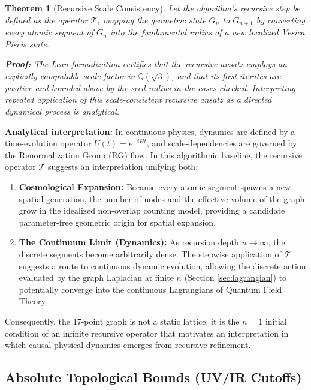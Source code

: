 \documentclass[12pt, a4paper]{article}
\newtheorem{theorem}{Theorem}
\begin{document}
\begin{theorem}[Recursive Scale Consistency]
Let the algorithm's recursive step be defined as the operator $\mathcal{T}$, mapping the geometric state $G_n$ to $G_{n+1}$ by converting every atomic segment of $G_n$ into the fundamental radius of a new localized Vesica Piscis state. 

\textbf{Proof:} The Lean formalization certifies that the recursive ansatz employs an explicitly computable scale factor in $\mathbb{Q}(\sqrt{3})$, and that its first iterates are positive and bounded above by the seed radius in the cases checked. Interpreting repeated application of this scale-consistent recursive ansatz as a directed dynamical process is analytical.
\end{theorem}

\textbf{Analytical interpretation:} In continuous physics, dynamics are defined by a time-evolution operator $U(t) = e^{-iHt}$, and scale-dependencies are governed by the Renormalization Group (RG) flow. In this algorithmic baseline, the recursive operator $\mathcal{T}$ suggests an interpretation unifying both:
\begin{enumerate}
    \item \textbf{Cosmological Expansion:} Because every atomic segment spawns a new spatial generation, the number of nodes and the effective volume of the graph grow in the idealized non-overlap counting model, providing a candidate parameter-free geometric origin for spatial expansion.
    \item \textbf{The Continuum Limit (Dynamics):} As recursion depth $n \to \infty$, the discrete segments become arbitrarily dense. The stepwise application of $\mathcal{T}$ suggests a route to continuous dynamic evolution, allowing the discrete action evaluated by the graph Laplacian at finite $n$ (Section \ref{sec:lagrangian}) to potentially converge into the continuous Lagrangians of Quantum Field Theory. 
\end{enumerate}

Consequently, the 17-point graph is not a static lattice; it is the $n=1$ initial condition of an infinite recursive operator that motivates an interpretation in which causal physical dynamics emerges from recursive refinement.

\subsection{Absolute Topological Bounds (UV/IR Cutoffs)}
\end{document}
